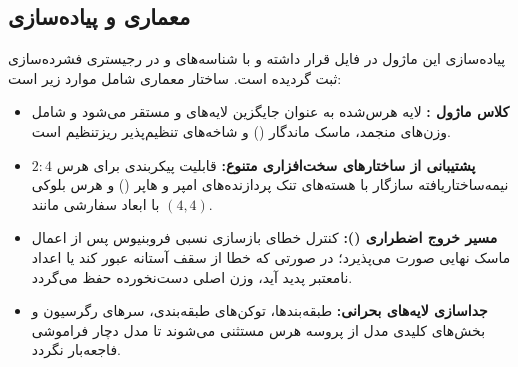 \subsection{معماری و پیاده‌سازی}
پیاده‌سازی این ماژول در فایل  قرار داشته و با شناسه‌های  و  در رجیستری فشرده‌سازی ثبت گردیده است. ساختار معماری شامل موارد زیر است:
\begin{itemize}
    \item \textbf{کلاس ماژول :} لایه هرس‌شده به عنوان جایگزین لایه‌های  و  مستقر می‌شود و شامل وزن‌های منجمد، ماسک ماندگار () و شاخه‌های تنظیم‌پذیر ریزتنظیم  است.
    \item \textbf{پشتیبانی از ساختارهای سخت‌افزاری متنوع:} قابلیت پیکربندی برای هرس $2:4$ نیمه‌ساختاریافته سازگار با هسته‌های تنک پردازنده‌های امپر و هاپر () و هرس بلوکی با ابعاد سفارشی مانند $(4, 4)$.
    \item \textbf{مسیر خروج اضطراری ():} کنترل خطای بازسازی نسبی فروبنیوس پس از اعمال ماسک نهایی صورت می‌پذیرد؛ در صورتی که خطا از سقف آستانه  عبور کند یا اعداد نامعتبر پدید آید، وزن اصلی دست‌نخورده حفظ می‌گردد.
    \item \textbf{جداسازی لایه‌های بحرانی:} طبقه‌بندها، توکن‌های طبقه‌بندی، سرهای رگرسیون و بخش‌های کلیدی مدل از پروسه هرس مستثنی می‌شوند تا مدل دچار فراموشی فاجعه‌بار نگردد.
\end{itemize}
